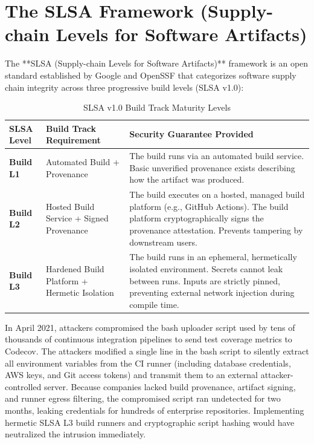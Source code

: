 \section{The SLSA Framework (Supply-chain Levels for Software Artifacts)}

The **SLSA (Supply-chain Levels for Software Artifacts)** framework is an open standard established by Google and OpenSSF that categorizes software supply chain integrity across three progressive build levels (SLSA v1.0):

\begin{table}[htbp]
\centering\small
\begin{tabular}{llp{7.5cm}}
\toprule
\textbf{SLSA Level} & \textbf{Build Track Requirement} & \textbf{Security Guarantee Provided} \\
\midrule
\textbf{Build L1} & Automated Build + Provenance & The build runs via an automated build service. Basic unverified provenance exists describing how the artifact was produced. \\
\textbf{Build L2} & Hosted Build Service + Signed Provenance & The build executes on a hosted, managed build platform (e.g., GitHub Actions). The build platform cryptographically signs the provenance attestation. Prevents tampering by downstream users. \\
\textbf{Build L3} & Hardened Build Platform + Hermetic Isolation & The build runs in an ephemeral, hermetically isolated environment. Secrets cannot leak between runs. Inputs are strictly pinned, preventing external network injection during compile time. \\
\bottomrule
\end{tabular}
\caption{SLSA v1.0 Build Track Maturity Levels}
\label{tab:slsa-levels}
\end{table}

\begin{realworldbox}
In April 2021, attackers compromised the bash uploader script used by tens of thousands of continuous integration pipelines to send test coverage metrics to Codecov. The attackers modified a single line in the bash script to silently extract all environment variables from the CI runner (including database credentials, AWS keys, and Git access tokens) and transmit them to an external attacker-controlled server. Because companies lacked build provenance, artifact signing, and runner egress filtering, the compromised script ran undetected for two months, leaking credentials for hundreds of enterprise repositories. Implementing hermetic SLSA L3 build runners and cryptographic script hashing would have neutralized the intrusion immediately.
\end{realworldbox}

